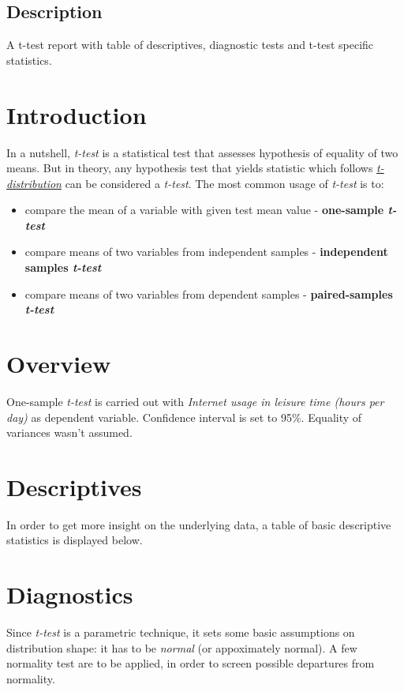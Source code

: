 \documentclass{article}
\begin{document}
\subsection{Description}

A t-test report with table of descriptives, diagnostic tests and t-test
specific statistics.

\section{Introduction}

In a nutshell, \emph{t-test} is a statistical test that assesses
hypothesis of equality of two means. But in theory, any hypothesis test
that yields statistic which follows
\href{https://en.wikipedia.org/wiki/Student\%27s\_t-distribution}{\emph{t-distribution}}
can be considered a \emph{t-test}. The most common usage of
\emph{t-test} is to:

\begin{itemize}
\item
  compare the mean of a variable with given test mean value -
  \textbf{one-sample \emph{t-test}}
\item
  compare means of two variables from independent samples -
  \textbf{independent samples \emph{t-test}}
\item
  compare means of two variables from dependent samples -
  \textbf{paired-samples \emph{t-test}}
\end{itemize}
\section{Overview}

One-sample \emph{t-test} is carried out with \emph{Internet usage in
leisure time (hours per day)} as dependent variable. Confidence interval
is set to 95\%. Equality of variances wasn't assumed.

\section{Descriptives}

In order to get more insight on the underlying data, a table of basic
descriptive statistics is displayed below.

\section{Diagnostics}

Since \emph{t-test} is a parametric technique, it sets some basic
assumptions on distribution shape: it has to be \emph{normal} (or
appoximately normal). A few normality test are to be applied, in order
to screen possible departures from normality.
\end{document}
